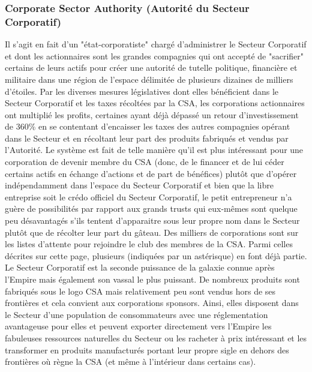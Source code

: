 \documentclass[twoside]{article}
\begin{document}
\subsubsection{Corporate Sector Authority (Autorité du Secteur Corporatif)}
Il s'agit en fait d'un "état-corporatiste" chargé d'administrer le Secteur Corporatif et dont les actionnaires sont les grandes compagnies qui ont accepté de "sacrifier" certains de leurs actifs pour créer une autorité de tutelle politique, financière et militaire dans une région de l'espace délimitée de plusieurs dizaines de milliers d'étoiles. Par les diverses mesures législatives dont elles bénéficient dans le Secteur Corporatif et les taxes récoltées par la CSA, les corporations actionnaires ont multiplié les profits, certaines ayant déjà dépassé un retour d'investissement de 360\% en se contentant d'encaisser les taxes des autres compagnies opérant dans le Secteur et en récoltant leur part des produits fabriqués et vendus par l'Autorité. Le système est fait de telle manière qu'il est plus intéressant pour une corporation de devenir membre du CSA (donc, de le financer et de lui céder certains actifs en échange d'actions et de part de bénéfices) plutôt que d'opérer indépendamment dans l'espace du Secteur Corporatif et bien que la libre entreprise soit le crédo officiel du Secteur Corporatif, le petit entrepreneur n'a guère de possibilités par rapport aux grands trusts qui eux-mêmes sont quelque peu désavantagés s'ils tentent d'apparaitre sous leur propre nom dans le Secteur plutôt que de récolter leur part du gâteau. Des milliers de corporations sont sur les listes d'attente pour rejoindre le club des membres de la CSA. Parmi celles décrites sur cette page, plusieurs (indiquées par un astérisque) en font déjà partie. Le Secteur Corporatif est la seconde puissance de la galaxie connue après l'Empire mais également son vassal le plus puissant. De nombreux produits sont fabriqués sous le logo CSA mais relativement peu sont vendus hors de ses frontières et cela convient aux corporations sponsors. Ainsi, elles disposent dans le Secteur d'une population de consommateurs avec une réglementation avantageuse pour elles et peuvent exporter directement vers l'Empire les fabuleuses ressources naturelles du Secteur ou les racheter à prix intéressant et les transformer en produits manufacturés portant leur propre sigle en dehors des frontières où règne la CSA (et même à l'intérieur dans certains cas).
\end{document}
